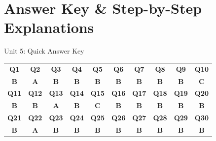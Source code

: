 \newpage
\section*{Answer Key \& Step-by-Step Explanations}

\begin{answerkeytable}{Unit 5: Quick Answer Key}
\begin{tabular}{c c c c c c c c c c}
\toprule
\textbf{Q1} & \textbf{Q2} & \textbf{Q3} & \textbf{Q4} & \textbf{Q5} & \textbf{Q6} & \textbf{Q7} & \textbf{Q8} & \textbf{Q9} & \textbf{Q10} \\
\textbf{B} & \textbf{A} & \textbf{B} & \textbf{B} & \textbf{B} & \textbf{B} & \textbf{B} & \textbf{B} & \textbf{B} & \textbf{C} \\
\midrule
\textbf{Q11} & \textbf{Q12} & \textbf{Q13} & \textbf{Q14} & \textbf{Q15} & \textbf{Q16} & \textbf{Q17} & \textbf{Q18} & \textbf{Q19} & \textbf{Q20} \\
\textbf{B} & \textbf{B} & \textbf{A} & \textbf{B} & \textbf{C} & \textbf{B} & \textbf{B} & \textbf{B} & \textbf{B} & \textbf{B} \\
\midrule
\textbf{Q21} & \textbf{Q22} & \textbf{Q23} & \textbf{Q24} & \textbf{Q25} & \textbf{Q26} & \textbf{Q27} & \textbf{Q28} & \textbf{Q29} & \textbf{Q30} \\
\textbf{B} & \textbf{A} & \textbf{B} & \textbf{B} & \textbf{B} & \textbf{B} & \textbf{B} & \textbf{B} & \textbf{B} & \textbf{B} \\
\bottomrule
\end{tabular}
\end{answerkeytable}

